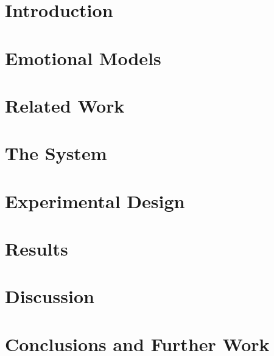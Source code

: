 \section{Introduction}

\section{Emotional Models}

\section{Related Work}

\section{The System}
\label{sec:system}

\section{Experimental Design}
\label{sec:experiment}

\section{Results}
\label{sec:result}

\section{Discussion}
\label{sec:discussion}

\section{Conclusions and Further Work}






